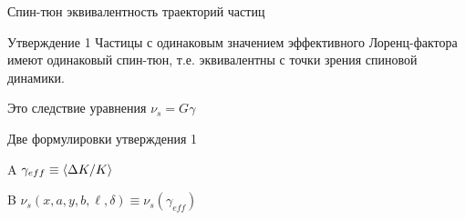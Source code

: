 \documentclass[14pt]{beamer}
\newcommand{\gef}{\gamma_{eff}}
\begin{document}
\begin{frame}{Спин-тюн эквивалентность траекторий частиц}
	\begin{block}{Утверждение 1}
		Частицы с одинаковым значением эффективного Лоренц-фактора имеют одинаковый спин-тюн, т.е. эквивалентны с точки зрения спиновой динамики.
	\end{block}
	\pause
	\begin{block}{Это следствие уравнения}
		 $\nu_s = G\gamma$
	\end{block}
\end{frame}
\begin{frame}{Две формулировки утверждения 1}
	\begin{block}{A}
		$\gef \equiv \avg{\Delta K/K}$
	\end{block}
	\pause
	\begin{block}{B}
		$\nu_s(x,a,y,b,\ell,\delta) \equiv \nu_s(\gef)$
	\end{block}
\end{frame}
\end{document}
